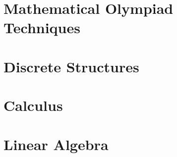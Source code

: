 \documentclass[11pt,a4paper]{article}
\begin{document}
\part{Mathematical Olympiad Techniques}






\part{Discrete Structures}







\part{Calculus}










\part{Linear Algebra}







\end{document}
